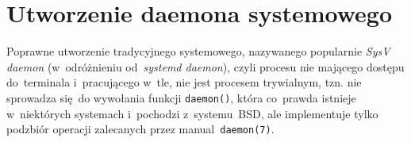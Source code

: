 \documentclass[thesis]{subfiles}
\begin{document}

\section{Utworzenie daemona systemowego}

Poprawne utworzenie tradycyjnego   systemowego, nazywanego popularnie \emph{SysV daemon} (w~odróżnieniu od~\emph{systemd daemon}), czyli procesu nie mającego dostępu do~terminala i~pracującego w~tle, nie jest procesem trywialnym, tzn. nie sprowadza się~do wywołania funkcji \texttt{daemon()}, która co~prawda istnieje w~niektórych systemach i~pochodzi z~systemu~BSD, ale implementuje tylko podzbiór operacji zalecanych przez manual~\texttt{daemon(7)}.
\end{document}

